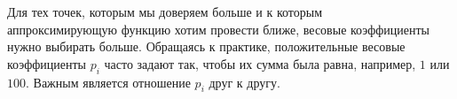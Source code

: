 \documentclass[a4paper,11pt]{article}
\begin{document}
Для тех точек, которым мы доверяем больше и к которым \\ аппроксимирующую функцию хотим провести ближе,
весовые коэффициенты нужно выбирать больше.
Обращаясь к практике, положительные весовые коэффициенты $p_i$ часто задают так, чтобы их сумма была равна, например, $1$ или $100$.
Важным является отношение $p_i$ друг к другу.
\end{document}
